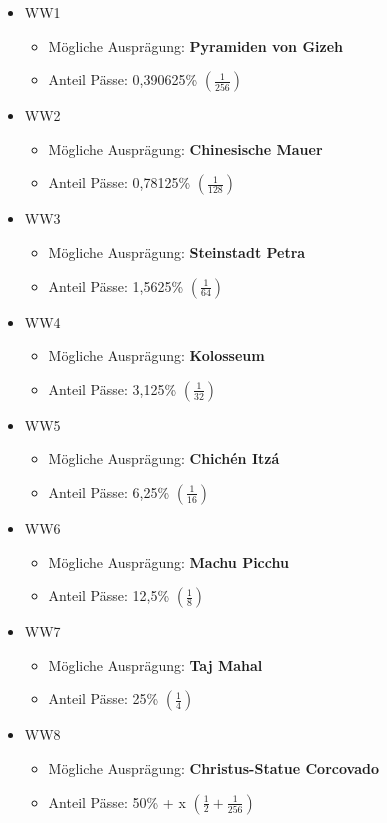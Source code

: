 \begin{NFT-Prop}
\begin{itemize}
    \item WW1
    \begin{itemize}
    	\item Mögliche Ausprägung: \textbf{Pyramiden von Gizeh}
    	\item Anteil Pässe: 0,390625\% $\left( \frac{1}{256} \right)$
    \end{itemize}
    \item WW2
    \begin{itemize}
    	\item Mögliche Ausprägung: \textbf{Chinesische Mauer}
    	\item Anteil Pässe: 0,78125\% $\left( \frac{1}{128} \right)$
    \end{itemize}
    \item WW3
    \begin{itemize}
    	\item Mögliche Ausprägung: \textbf{Steinstadt Petra} 
    	\item Anteil Pässe: 1,5625\% $\left( \frac{1}{64} \right)$
    \end{itemize}
    \item WW4
    \begin{itemize}
    	\item Mögliche Ausprägung: \textbf{Kolosseum} 
    	\item Anteil Pässe: 3,125\% $\left( \frac{1}{32} \right)$
    \end{itemize}
    \item WW5
    \begin{itemize}
    	\item Mögliche Ausprägung: \textbf{Chichén Itzá} 
    	\item Anteil Pässe: 6,25\% $\left( \frac{1}{16} \right)$
    \end{itemize}
    \item WW6
    \begin{itemize}
    	\item Mögliche Ausprägung: \textbf{Machu Picchu} 
    	\item Anteil Pässe: 12,5\% $\left( \frac{1}{8} \right)$
    \end{itemize}
    \item WW7
    \begin{itemize}
    	\item Mögliche Ausprägung: \textbf{Taj Mahal} 
    	\item Anteil Pässe: 25\% $\left( \frac{1}{4} \right)$
    \end{itemize}
    \item WW8
    \begin{itemize}
    	\item Mögliche Ausprägung: \textbf{Christus-Statue Corcovado} 
    	\item Anteil Pässe: 50\% + x $\left( \frac{1}{2} + \frac{1}{256} \right)$
    \end{itemize}
\end{itemize}

\end{NFT-Prop}

